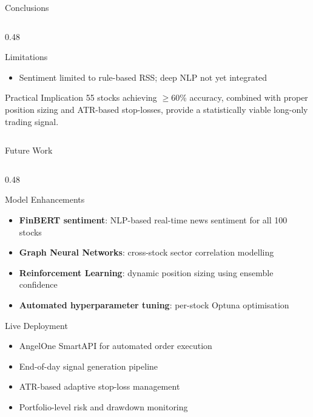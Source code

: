 \documentclass[aspectratio=43,11pt]{beamer}
\begin{document}
\begin{frame}[shrink=3]{Conclusions}
\begin{columns}[T]
\begin{column}{0.48\textwidth}
\begin{alertblock}{Limitations}
\begin{itemize}
                    \item Sentiment limited to rule-based RSS; deep NLP not yet integrated
                \end{itemize}
            \end{alertblock}
            \begin{block}{Practical Implication}
                \footnotesize 55 stocks achieving $\geq$60\% accuracy, combined with proper position sizing and ATR-based stop-losses, provide a statistically viable long-only trading signal.
            \end{block}
        \end{column}
    \end{columns}
\end{frame}

\begin{frame}[shrink=12]{Future Work}
    \begin{columns}[T]
        \begin{column}{0.48\textwidth}
            \begin{block}{Model Enhancements}
                \footnotesize\setlength{\itemsep}{1pt}
                \begin{itemize}
                    \item \textbf{FinBERT sentiment}: NLP-based real-time news sentiment for all 100 stocks
                    \item \textbf{Graph Neural Networks}: cross-stock sector correlation modelling
                    \item \textbf{Reinforcement Learning}: dynamic position sizing using ensemble confidence
                    \item \textbf{Automated hyperparameter tuning}: per-stock Optuna optimisation
                \end{itemize}
            \end{block}
            \begin{block}{Live Deployment}
                \footnotesize\setlength{\itemsep}{1pt}
                \begin{itemize}
                    \item AngelOne SmartAPI for automated order execution
                    \item End-of-day signal generation pipeline
                    \item ATR-based adaptive stop-loss management
                    \item Portfolio-level risk and drawdown monitoring

\end{itemize}
\end{block}
\end{column}
\end{columns}
\end{frame}
\end{document}
